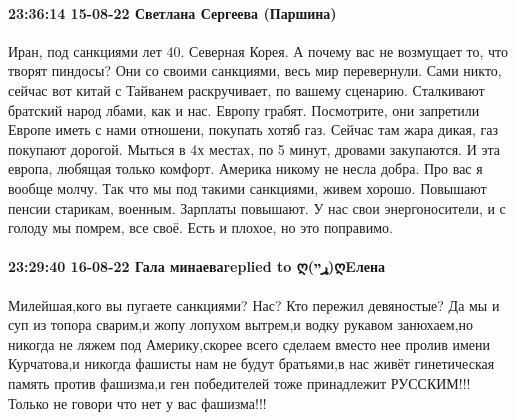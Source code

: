  
 
 
 
 

\paragraph{23:36:14 15-08-22 Светлана Сергеева (Паршина)}

Иран, под санкциями лет 40. Северная Корея. А почему вас не возмущает то, что
творят пиндосы? Они со своими санкциями, весь мир перевернули. Сами никто,
сейчас вот китай с Тайванем раскручивает, по вашему сценарию. Сталкивают
братский народ лбами, как и нас. Европу грабят. Посмотрите, они запретили
Европе иметь с нами отношени, покупать хотяб газ. Сейчас там жара дикая, газ
покупают дорогой. Мыться в 4х местах, по 5 минут, дровами закупаются. И эта
европа, любящая только комфорт. Америка никому не несла добра. Про вас я вообще
молчу. Так что мы под такими санкциями, живем хорошо. Повышают пенсии старикам,
военным. Зарплаты повышают. У нас свои энергоносители, и с голоду мы помрем,
все своё. Есть и плохое, но это поправимо.

\paragraph{23:29:40 16-08-22 Гала минаеваreplied to ღ(ړײ)ღEлена}

Милейшая,кого вы пугаете санкциями? Нас? Кто пережил девяностые? Да мы и суп из
топора сварим,и жопу лопухом вытрем,и водку рукавом занюхаем,но никогда не
ляжем под Америку,скорее всего сделаем вместо нее пролив имени Курчатова,и
никогда фашисты нам не будут братьями,в нас живёт гинетическая память против
фашизма,и ген победителей тоже принадлежит РУССКИМ!!! Только не говори что нет
у вас фашизма!!!
